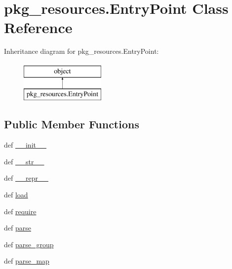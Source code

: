 \hypertarget{classpkg__resources_1_1EntryPoint}{}\section{pkg\+\_\+resources.\+Entry\+Point Class Reference}
\label{classpkg__resources_1_1EntryPoint}
Inheritance diagram for pkg\+\_\+resources.\+Entry\+Point\+:\begin{figure}[H]
\begin{center}
\leavevmode
\includegraphics[height=2.000000cm]{classpkg__resources_1_1EntryPoint}
\end{center}
\end{figure}
\subsection*{Public Member Functions}
\begin{DoxyCompactItemize}
\item 
def \hyperlink{classpkg__resources_1_1EntryPoint_af484c28c6559879ad69e656afb675ebd}{\+\_\+\+\_\+init\+\_\+\+\_\+}
\item 
def \hyperlink{classpkg__resources_1_1EntryPoint_af91f72c535183b005acdf85bd46f7369}{\+\_\+\+\_\+str\+\_\+\+\_\+}
\item 
def \hyperlink{classpkg__resources_1_1EntryPoint_ab05ef1846040d8ef03f6dfa73d3c35fc}{\+\_\+\+\_\+repr\+\_\+\+\_\+}
\item 
def \hyperlink{classpkg__resources_1_1EntryPoint_a30c1f9b8ead0886eefd541223e39a3e0}{load}
\item 
def \hyperlink{classpkg__resources_1_1EntryPoint_a66ca79ae14930074b7480c36e87d9032}{require}
\item 
def \hyperlink{classpkg__resources_1_1EntryPoint_aed3f3dcaaecb5ee65838900073f950fa}{parse}
\item 
def \hyperlink{classpkg__resources_1_1EntryPoint_a86588de59a6f7de4511482cf959bd2f9}{parse\+\_\+group}
\item 
def \hyperlink{classpkg__resources_1_1EntryPoint_a5477055ebd95f7495486c137448c8dd3}{parse\+\_\+map}
\end{DoxyCompactItemize}
